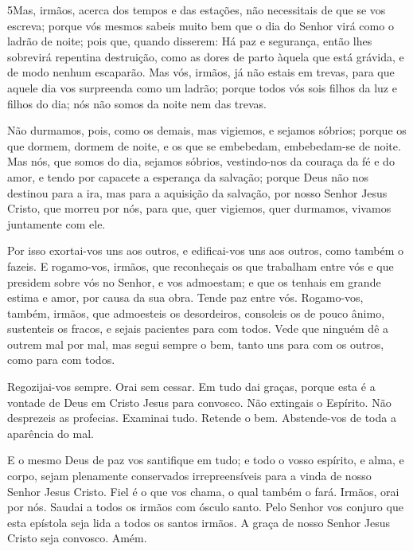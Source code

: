 \medskip

\lettrine{5} Mas, irmãos, acerca dos tempos e das estações,
não necessitais de que se vos escreva; porque vós mesmos sabeis
muito bem que o dia do Senhor virá como o ladrão de noite; pois
que, quando disserem: Há paz e segurança, então lhes sobrevirá
repentina destruição, como as dores de parto àquela que está
grávida, e de modo nenhum escaparão. Mas vós, irmãos, já não
estais em trevas, para que aquele dia vos surpreenda como um ladrão;
porque todos vós sois filhos da luz e filhos do dia; nós não
somos da noite nem das trevas.

Não durmamos, pois, como os demais, mas vigiemos, e sejamos
sóbrios; porque os que dormem, dormem de noite, e os que se
embebedam, embebedam-se de noite. Mas nós, que somos do dia,
sejamos sóbrios, vestindo-nos da couraça da fé e do amor, e tendo
por capacete a esperança da salvação; porque Deus não nos
destinou para a ira, mas para a aquisição da salvação, por nosso
Senhor Jesus Cristo, que morreu por nós, para que, quer
vigiemos, quer durmamos, vivamos juntamente com ele.

Por isso exortai-vos uns aos outros, e edificai-vos uns aos
outros, como também o fazeis. E rogamo-vos, irmãos, que
reconheçais os que trabalham entre vós e que presidem sobre vós no
Senhor, e vos admoestam; e que os tenhais em grande estima e
amor, por causa da sua obra. Tende paz entre vós. Rogamo-vos,
também, irmãos, que admoesteis os desordeiros, consoleis os de pouco
ânimo, sustenteis os fracos, e sejais pacientes para com todos.
Vede que ninguém dê a outrem mal por mal, mas segui sempre o
bem, tanto uns para com os outros, como para com todos.

Regozijai-vos sempre. Orai sem cessar. Em tudo dai
graças, porque esta é a vontade de Deus em Cristo Jesus para
convosco. Não extingais o Espírito. Não desprezeis as
profecias. Examinai tudo. Retende o bem. Abstende-vos
de toda a aparência do mal.

E o mesmo Deus de paz vos santifique em tudo; e todo o vosso
espírito, e alma, e corpo, sejam plenamente conservados
irrepreensíveis para a vinda de nosso Senhor Jesus Cristo.
Fiel é o que vos chama, o qual também o fará. Irmãos,
orai por nós. Saudai a todos os irmãos com ósculo santo.
Pelo Senhor vos conjuro que esta epístola seja lida a todos
os santos irmãos. A graça de nosso Senhor Jesus Cristo seja
convosco. Amém.

